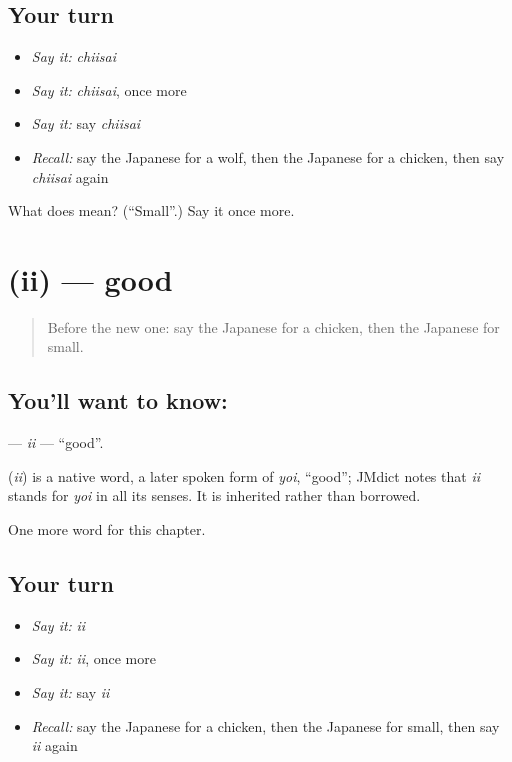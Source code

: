 \subsection*{Your turn}
\begin{itemize}
\raggedright
  \item \emph{Say it:} \emph{chiisai}
  \item \emph{Say it:} \emph{chiisai}, once more
  \item \emph{Say it:} say \emph{chiisai}
  \item \emph{Recall:} say the Japanese for a wolf, then the Japanese for a chicken, then say \emph{chiisai} again
\end{itemize}

\begin{tcolorbox}[breakable,colback=teal!4,colframe=teal!35!black,title={Before you move on}]
What does  mean? (\textquotedblleft{}Small\textquotedblright{}.) Say it once more.
\end{tcolorbox}
\section[\texorpdfstring{\ja{いい} (ii)}{いい (ii)}]{ (ii) — good}

\label{lesson:JA-C48-ii}



\begin{quote}
Before the new one: say the Japanese for a chicken, then the Japanese for small.
\end{quote}

\subsection*{You'll want to know: }
\textbf{} — \emph{ii} — \textquotedblleft{}good\textquotedblright{}.

\begin{cousinweb}
\textbf{} (\emph{ii}) is a native word, a later spoken form of \emph{yoi}, \textquotedblleft{}good\textquotedblright{}; JMdict notes that \emph{ii} stands for \emph{yoi} in all its senses. It is inherited rather than borrowed.
\end{cousinweb}

\begin{grammarlens}[title={What you've built}]
One more word for this chapter.
\end{grammarlens}

\subsection*{Your turn}
\begin{itemize}
\raggedright
  \item \emph{Say it:} \emph{ii}
  \item \emph{Say it:} \emph{ii}, once more
  \item \emph{Say it:} say \emph{ii}
  \item \emph{Recall:} say the Japanese for a chicken, then the Japanese for small, then say \emph{ii} again
\end{itemize}

